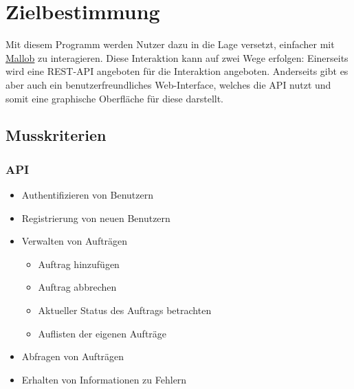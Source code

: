 \section{Zielbestimmung}
Mit diesem Programm werden Nutzer dazu in die Lage versetzt, einfacher mit \href{https://github.com/domschrei/mallob}{Mallob} zu interagieren. Diese Interaktion kann auf zwei Wege erfolgen:
Einerseits wird eine REST-API angeboten für die Interaktion angeboten. Anderseits gibt es aber auch ein benutzerfreundliches Web-Interface, welches die API nutzt und somit eine graphische Oberfläche für diese darstellt.
\subsection{Musskriterien}
    \subsubsection{API}
        \begin{itemize}
            \item Authentifizieren von Benutzern
            \item Registrierung von neuen Benutzern
            \item Verwalten von Aufträgen
                \begin{itemize}
                    \item Auftrag hinzufügen
                    \item Auftrag abbrechen
                    \item Aktueller Status des Auftrags betrachten
                    \item Auflisten der eigenen Aufträge
                \end{itemize}
            \item Abfragen von Aufträgen
            \item Erhalten von Informationen zu Fehlern
        \end{itemize}
